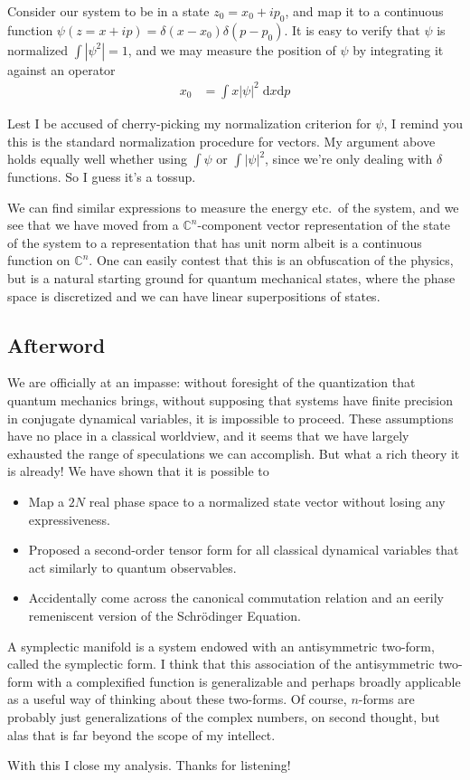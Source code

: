 \documentclass[10pt]{article}
\newcommand{\abs}[1]{\left|#1\right|}
\begin{document}
Consider our system to be in a state $z_0 = x_0 + ip_0$, and map it to a
continuous function $\psi(z=x+ip) = \delta(x-x_0)\delta(p-p_0)$. It is easy to
verify that $\psi$ is normalized $\int \abs{\psi^2} = 1$, and we may measure the
position of $\psi$ by integrating it against an operator
\begin{align}
    x_0 &= \int x \abs{\psi}^2 \;\mathrm{d}x\mathrm{d}p
\end{align}

Lest I be accused of cherry-picking my normalization criterion for $\psi$, I
remind you this is the standard normalization procedure for vectors. My argument
above holds equally well whether using $\int \psi$ or $\int \abs{\psi}^2$, since
we're only dealing with $\delta$ functions. So I guess it's a tossup.

We can find similar expressions to measure the energy etc.\ of the system, and we
see that we have moved from a $\mathbb{C}^n$-component vector representation of
the state of the system to a representation that has unit norm albeit is a
continuous function on $\mathbb{C}^n$. One can easily contest that this is an
obfuscation of the physics, but is a natural starting ground for quantum
mechanical states, where the phase space is discretized and we can have linear
superpositions of states.

\subsection{Afterword}

We are officially at an impasse: without foresight of the quantization that
quantum mechanics brings, without supposing that systems have finite precision
in conjugate dynamical variables, it is impossible to proceed. These assumptions
have no place in a classical worldview, and it seems that we have largely
exhausted the range of speculations we can accomplish. But what a rich theory it
is already! We have shown that it is possible to
\begin{itemize}
    \item Map a $2N$ real phase space to a normalized state vector without
        losing any expressiveness.

    \item Proposed a second-order tensor form for all classical dynamical
        variables that act similarly to quantum observables.

    \item Accidentally come across the canonical commutation relation and an
        eerily remeniscent version of the Schr\"odinger Equation.
\end{itemize}

A symplectic manifold is a system endowed with an antisymmetric two-form, called
the symplectic form. I think that this association of the antisymmetric two-form
with a complexified function is generalizable and perhaps broadly applicable as
a useful way of thinking about these two-forms. Of course, $n$-forms are
probably just generalizations of the complex numbers, on second thought, but
alas that is far beyond the scope of my intellect.

With this I close my analysis. Thanks for listening!
\end{document}
